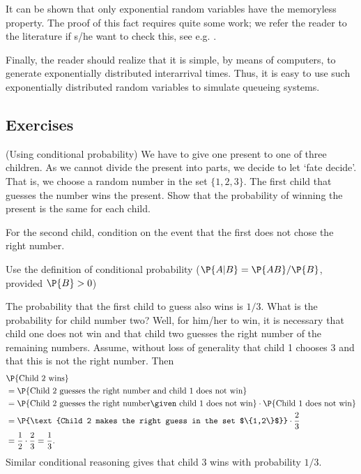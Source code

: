 It can be shown that only exponential random variables have the
memoryless property. The proof of this fact requires quite some work;
we refer the reader to the literature if s/he want to check this, see
e.g. \citet[Appendix 3]{yushkevich69:_markov_proces}.

Finally, the reader should realize that it is simple, by means of
computers, to generate exponentially distributed interarrival
times. Thus, it is easy to use such exponentially distributed random
variables to simulate queueing systems. 

\subsection*{Exercises}
\label{sec:exercises}


\begin{question}(Using conditional probability)
  We have to give one present to one of three children. As we cannot
  divide the present into parts, we decide to let `fate decide'. That
  is, we choose a random number in the set $\{1, 2, 3\}$. The first
  child that guesses the number wins the present. Show that the
  probability of winning the present is the same for each child.
  \begin{hint}
    For the second child, condition on the event that the first does not chose the right number.
  \end{hint}
\begin{solution}
    Use the definition of conditional probability
    ($\P{A|B} = \P{AB}/\P{B}$, provided $\P{B}>0$)

    The probability that the first child to guess also wins is
    $1/3$. What is the probability for child number two? Well, for
    him/her to win, it is necessary that child one does not win and
    that child two guesses the right number of the remaining
    numbers. Assume, without loss of generality that child 1 chooses
    $3$ and that this is not the right number. Then 
    \begin{equation*}
      \begin{split}
&\P{\text{Child  2 wins}} \\
&= \P{\text{Child 2 guesses the right number and child 1 does not win}} \\
&= \P{\text{Child 2 guesses the right number} \given \text{ child 1 does not win}}
\cdot \P{\text{Child 1 does not win}} \\
&= \P{\text{Child 2 makes the right guess in the set $\{1,2\}$}}\cdot \frac 23 \\
&= \frac 1 2\cdot \frac 23  = \frac 1 3.
      \end{split}
    \end{equation*}
    Similar conditional reasoning gives that child 3 wins with probability $1/3$. 
  \end{solution}
\end{question}


